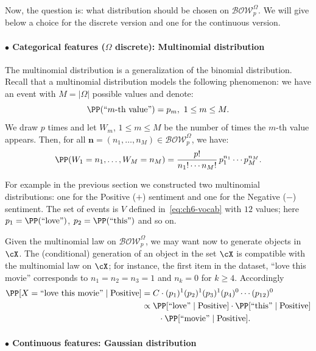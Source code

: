 Now, the question is: what distribution should be chosen on
$\mathcal{BOW}_{p}^{\Omega}$. We will give below a choice for the discrete
version and one for the continuous version.

\paragraph{$\bullet$ Categorical features ($\Omega$ discrete): Multinomial
distribution}

The multinomial distribution is a generalization of the binomial
distribution. Recall that a multinomial distribution models the following
phenomenon: we have an event with $M=|\Omega|$ possible values and denote:
\[
  \PP(\text{``$m$-th value''})=p_{m},\ 1\le m\le M.
\]
We draw $p$ times and let $W_{m}$, $1\le m\le M$ be the number of times the
$m$-th value appears. Then, for all
$\mathbf{n}=(n_{1},\dots,n_{M})\in\mathcal{BOW}_{p}^{\Omega}$, we have:
\[
  \PP(W_{1}=n_{1},\dots,W_{M}=n_{M})
   =\frac{p!}{n_{1}!\cdots n_{M}!}\,p_{1}^{n_{1}}\cdots p_{M}^{n_{M}}.
\]

For example in the previous section we constructed two multinomial
distributions: one for the Positive ($+$) sentiment and one for the Negative
($-$) sentiment. The set of events is $V$ defined in~\eqref{eq:ch6-vocab} with
$12$ values; here $p_{1}=\PP(\text{``love''})$, $p_{2}=\PP(\text{``this''})$
and so on.

Given the multinomial law on $\mathcal{BOW}_{p}^{\Omega}$, we may want now to
generate objects in $\cX$. The (conditional) generation of an object in the
set $\cX$ is compatible with the multinomial law on $\cX$; for instance, the
first item in the dataset, ``love this movie'' corresponds to
$n_{1}=n_{2}=n_{3}=1$ and $n_{k}=0$ for $k\ge 4$. Accordingly
\begin{align}
  \PP[X=\text{``love this movie''}\mid\text{Positive}]
    &= C\cdot(p_{1})^{1}(p_{2})^{1}(p_{3})^{1}(p_{4})^{0}\cdots(p_{12})^{0}
     \nonumber\\
    &\propto \PP[\text{``love''}\mid\text{Positive}]
            \cdot\PP[\text{``this''}\mid\text{Positive}] \nonumber\\
    &\qquad\cdot\PP[\text{``movie''}\mid\text{Positive}].
  \label{eq:ch6-multinom-example}
\end{align}

\paragraph{$\bullet$ Continuous features: Gaussian distribution}


